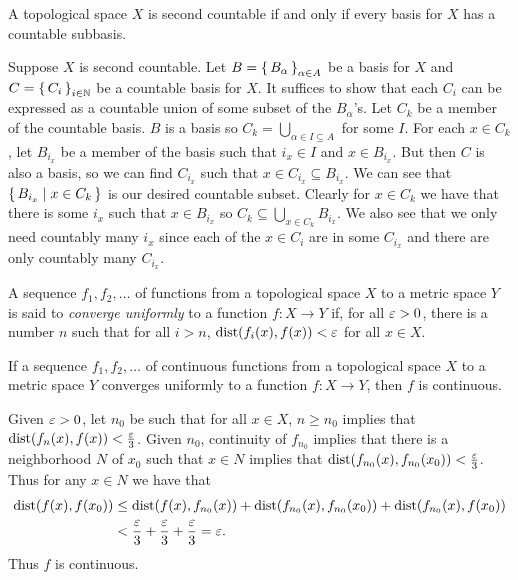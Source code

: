 \documentclass[letterpaper, 11pt]{article}
\begin{document}
\begin{prop}
  A topological space $X$ is second countable if and only if every basis for $X$ has a countable subbasis.
\end{prop}
\begin{pf}
  Suppose $X$ is second countable.
  Let $B = \set{B_{\alpha}}_{\alpha \in A}$ be a basis for $X$ and $C = \set{C_{i}}_{i \in \mathbb{N}}$ be a countable basis for $X$.
  It suffices to show that each $C_{i}$ can be expressed as a countable union of some subset of the $B_{\alpha}$'s.
  Let $C_{k}$ be a member of the countable basis.
  $B$ is a basis so $C_{k} = \bigcup_{\alpha \in I \subseteq A}$ for some $I$.
  For each $x \in C_{k}$, let $B_{i_{x}}$ be a member of the basis such that $i_{x} \in I$ and $x \in B_{i_{x}}$.
  But then $C$ is also a basis, so we can find $C_{i_{x}}$ such that $x \in C_{i_{x}} \subseteq B_{i_{x}}$.
  We can see that $\set{B_{i_{x}} | x \in C_{k}}$ is our desired countable subset.
  Clearly for $x \in C_{k}$ we have that there is some $i_{x}$ such that $x \in B_{i_{x}}$ so $C_{k} \subseteq \bigcup_{x \in C_{k}} B_{i_{x}}$.
  We also see that we only need countably many $i_{x}$ since each of the $x \in C_{i}$ are in some $C_{i_{x}}$ and there are only countably many $C_{i_{x}}$.
\end{pf}

\begin{defn}
  A sequence $f_{1}, f_{2}, \ldots$ of functions from a topological space $X$ to a metric space $Y$ is said to \emph{converge uniformly} to a function $f\colon X \to Y$ if, for all $\varepsilon > 0$, there is a number $n$ such that for all $i > n$, $\operatorname{dist}(f_{i}(x), f(x)) < \varepsilon$ for all $x \in X$.
\end{defn}

\begin{thrm}
  If a sequence $f_{1}, f_{2}, \ldots$ of continuous functions from a topological space $X$ to a metric space $Y$ converges uniformly to a function $f\colon X \to Y$, then $f$ is continuous.
\end{thrm}
\begin{pf}
  Given $\varepsilon > 0$, let $n_{0}$ be such that for all $x \in X$, $n \geq n_{0}$ implies that $\operatorname{dist}(f_{n}(x), f(x)) < \frac{\varepsilon}{3}$.
  Given $n_{0}$, continuity of $f_{n_{0}}$ implies that there is a neighborhood $N$ of $x_{0}$ such that $x \in N$ implies that $\operatorname{dist}(f_{n_{0}}(x), f_{n_{0}}(x_{0})) < \frac{\varepsilon}{3}$.
  Thus for any $x \in N$ we have that
  \begin{align*}
    \operatorname{dist}(f(x), f(x_{0})) &\leq \operatorname{dist}(f(x), f_{n_{0}}(x)) + \operatorname{dist}(f_{n_{0}}(x), f_{n_{0}}(x_{0})) + \operatorname{dist}(f_{n_{0}}(x), f(x_{0})) \\
                          &< \frac{\varepsilon}{3} + \frac{\varepsilon}{3} + \frac{\varepsilon}{3} = \varepsilon.
  \end{align*}
  Thus $f$ is continuous.
\end{pf}
\end{document}
